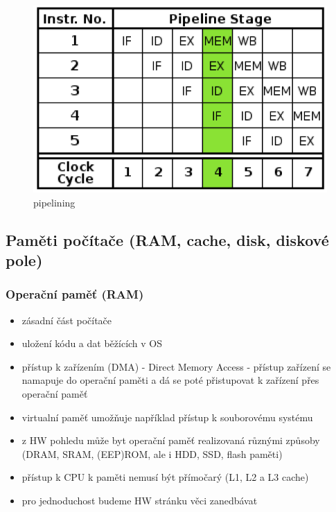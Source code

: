 \documentclass[10pt,a4paper]{article}
\begin{document}
\begin{figure} [h]
		\includegraphics[scale=0.7]{img/pipelining.png}
		\caption{pipelining}	
\end{figure}


\clearpage
\subsection{Paměti počítače (RAM, cache, disk, diskové pole)}

\subsubsection{Operační paměť (RAM)}
\begin{itemize}
	\item zásadní část počítače
	\item uložení kódu a dat běžících v OS
	\item přístup k zařízením (DMA) - Direct Memory Access - přístup zařízení se namapuje do
operační paměti a dá se poté přistupovat k zařízení přes operační paměť
	\item virtualní paměť umožňuje například přístup k souborovému systému
	\item z HW pohledu může byt operační paměť realizovaná různými způsoby (DRAM, SRAM,
(EEP)ROM, ale i HDD, SSD, flash paměti)
	\item přístup k CPU k paměti nemusí být přímočarý (L1, L2 a L3 cache)
	\item pro jednoduchost budeme HW stránku věci zanedbávat
\end{itemize}
\end{document}
